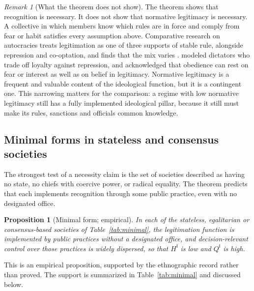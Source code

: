 \documentclass[11pt,letterpaper]{article}
\newtheorem{proposition}[theorem]{Proposition}
\theoremstyle{definition}
\theoremstyle{remark}
\newtheorem{remark}[theorem]{Remark}
\newcommand{\pI}{\mathsf{I}}
\begin{document}
\begin{remark}[What the theorem does not show]
\label{rem:ideological-power:scope}
The theorem shows that recognition is necessary. It does not show that normative legitimacy is necessary. A collective in which members know which rules are in force and comply from fear or habit satisfies every assumption above. Comparative research on autocracies treats legitimation as one of three supports of stable rule, alongside repression and co-optation, and finds that the mix varies \citep{gerschewski2013}. \citet{wintrobe1998} modeled dictators who trade off loyalty against repression, and \citet{weber1978} acknowledged that obedience can rest on fear or interest as well as on belief in legitimacy. Normative legitimacy is a frequent and valuable content of the ideological function, but it is a contingent one. This narrowing matters for the comparison: a regime with low normative legitimacy still has a fully implemented ideological pillar, because it still must make its rules, sanctions and officials common knowledge.
\end{remark}

\subsection{Minimal forms in stateless and consensus societies}

The strongest test of a necessity claim is the set of societies described as having no state, no chiefs with coercive power, or radical equality. The theorem predicts that each implements recognition through some public practice, even with no designated office.

\begin{proposition}[Minimal form; empirical]
\label{prop:ideological-power:minimal-form}
In each of the stateless, egalitarian or consensus-based societies of Table~\ref{tab:minimal}, the legitimation function is implemented by public practices without a designated office, and decision-relevant control over those practices is widely dispersed, so that $H^{\pI}$ is low and $Q^{\pI}$ is high.
\end{proposition}

This is an empirical proposition, supported by the ethnographic record rather than proved. The support is summarized in Table~\ref{tab:minimal} and discussed below.
\end{document}
